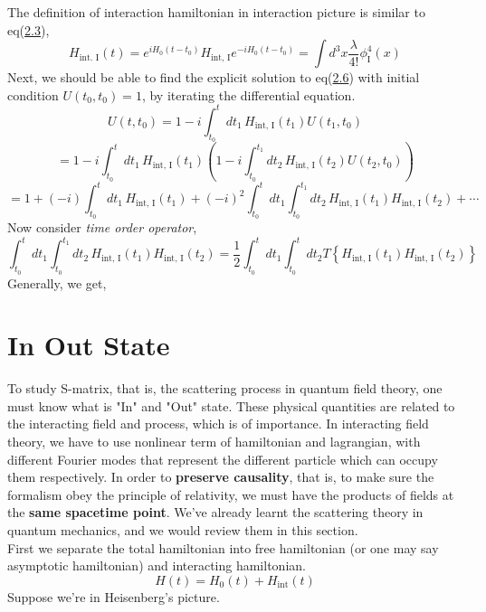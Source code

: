 \documentclass[12pt]{article}
\numberwithin{equation}{section}
\begin{document}
The definition of interaction hamiltonian in interaction picture is similar to eq(\hyperref[2.3]{2.3}),
\begin{equation}
    H_{\text{int. I}}(t) = e^{iH_0(t-t_0)}H_{\text{int, I}}e^{-iH_0(t-t_0)} = \int{d^3x\frac{\lambda}{4!}\phi_{\text{I}}^{4}(x)}
\end{equation}
Next, we should be able to find the explicit solution to eq(\hyperref[2.6]{2.6}) with initial condition $U(t_0, t_0) = 1$, by iterating the differential equation.
\begin{equation}
    U(t,t_0) = 1-i\int_{t_0}^{t}{dt_1\,H_{\text{int, I}}(t_1)U(t_1, t_0)}
\end{equation}
\[ = 1-i\int_{t_0}^{t}{dt_1\,H_{\text{int, I}}(t_1)\left(1-i\int_{t_0}^{t_1}{dt_2\,H_{\text{int, I}}(t_2)U(t_2, t_0)}\right)} \]
\[ = 1+(-i)\int_{t_0}^{t}{dt_1\,H_{\text{int, I}}(t_1)} + (-i)^2\int_{t_0}^{t}dt_1\int_{t_0}^{t_1}dt_2\,H_{\text{int, I}}(t_1)H_{\text{int, I}}(t_2)+\cdots\]
Now consider \textit{time order operator},
\begin{equation}
    \int_{t_0}^{t}dt_1\int_{t_0}^{t_1}dt_2{\,H_{\text{int, I}}(t_1)H_{\text{int, I}}(t_2)} = \frac{1}{2}\int_{t_0}^{t}dt_1\int_{t_0}^{t}dt_2{T\left\{H_{\text{int, I}}(t_1)H_{{\text{int, I}}}(t_2)\right\}}
\end{equation}
Generally, we get,


\section{In Out State}
To study S-matrix, that is, the scattering process in quantum field theory, one must know what is "In" and "Out" state.
These physical quantities are related to the interacting field and process, which is of importance.
In interacting field theory, we have to use nonlinear term of hamiltonian and lagrangian, with different Fourier modes that represent the different particle which can occupy them respectively.
In order to \textbf{preserve causality}, that is, to make sure the formalism obey the principle of relativity, we must have the products of fields at the \textbf{same spacetime point}.
We've already learnt the scattering theory in quantum mechanics, and we would review them in this section.
\\\indent First we separate the total hamiltonian into free hamiltonian (or one may say asymptotic hamiltonian) and interacting hamiltonian.
\begin{equation}
    H(t) = H_{0}(t) + H_{\text{int}}(t)
\end{equation}
Suppose we're in Heisenberg's picture.
\end{document}
